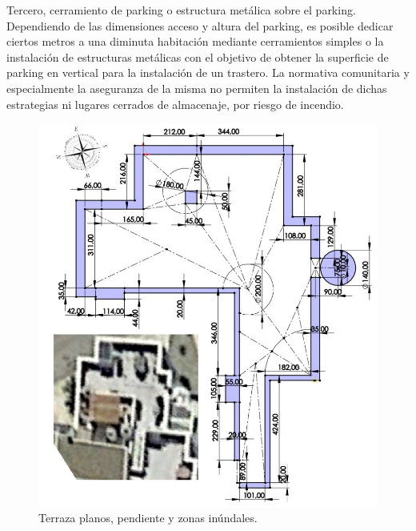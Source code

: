 Tercero, cerramiento de parking o estructura metálica sobre el parking. Dependiendo de las dimensiones acceso y altura del parking, es posible dedicar ciertos metros a una diminuta habitación mediante cerramientos simples o la instalación de estructuras metálicas con el objetivo de obtener la superficie de parking en vertical para la instalación de un trastero. La normativa comunitaria y especialmente la aseguranza de la misma no permiten la instalación de dichas estrategias ni lugares cerrados de almacenaje, por riesgo de incendio.

\begin{figure}[!htb]
\begin{center}
\includegraphics[width=1\textwidth]{./figuras/terraza.jpg}
\caption{Terraza planos, pendiente y zonas inúndales.}
\label{F:terraza}
\end{center}
\end{figure}

